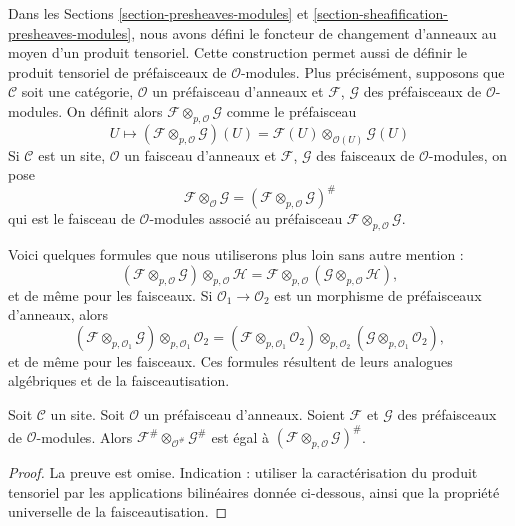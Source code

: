 \noindent
Dans les Sections \ref{section-presheaves-modules} et
\ref{section-sheafification-presheaves-modules}, nous avons défini le
foncteur de changement d'anneaux au moyen d'un produit tensoriel.
Cette construction permet aussi de définir le produit tensoriel de
préfaisceaux de $\mathcal{O}$-modules. Plus précisément, supposons que
$\mathcal{C}$ soit une catégorie, $\mathcal{O}$ un préfaisceau d'anneaux et
$\mathcal{F}$, $\mathcal{G}$ des préfaisceaux de $\mathcal{O}$-modules.
On définit alors $\mathcal{F} \otimes_{p, \mathcal{O}} \mathcal{G}$ comme le
préfaisceau
$$
U
\longmapsto
(\mathcal{F} \otimes_{p, \mathcal{O}} \mathcal{G})(U)
=
\mathcal{F}(U) \otimes_{\mathcal{O}(U)} \mathcal{G}(U)
$$
Si $\mathcal{C}$ est un site, $\mathcal{O}$ un faisceau d'anneaux et
$\mathcal{F}$, $\mathcal{G}$ des faisceaux de $\mathcal{O}$-modules, on pose
$$
\mathcal{F} \otimes_\mathcal{O} \mathcal{G}
=
(\mathcal{F} \otimes_{p, \mathcal{O}} \mathcal{G})^\#
$$
qui est le faisceau de $\mathcal{O}$-modules associé au préfaisceau
$\mathcal{F} \otimes_{p, \mathcal{O}} \mathcal{G}$.

\medskip\noindent
Voici quelques formules que nous utiliserons plus loin sans autre mention :
$$
(\mathcal{F}
\otimes_{p, \mathcal{O}} \mathcal{G})
\otimes_{p, \mathcal{O}} \mathcal{H}
=
\mathcal{F}
\otimes_{p, \mathcal{O}} (\mathcal{G}
\otimes_{p, \mathcal{O}} \mathcal{H}),
$$
et de même pour les faisceaux.
Si $\mathcal{O}_1 \to \mathcal{O}_2$ est un morphisme de préfaisceaux
d'anneaux, alors
$$
(\mathcal{F} \otimes_{p, \mathcal{O}_1} \mathcal{G})
\otimes_{p, \mathcal{O}_1} \mathcal{O}_2 =
(\mathcal{F} \otimes_{p, \mathcal{O}_1} \mathcal{O}_2)
\otimes_{p, \mathcal{O}_2}
(\mathcal{G} \otimes_{p, \mathcal{O}_1} \mathcal{O}_2),
$$
et de même pour les faisceaux.
Ces formules résultent de leurs analogues algébriques et de la
faisceautisation.

\begin{lemma}
\label{lemma-sheafification-tensor}
Soit $\mathcal{C}$ un site. Soit $\mathcal{O}$ un préfaisceau d'anneaux.
Soient $\mathcal{F}$ et $\mathcal{G}$ des préfaisceaux de
$\mathcal{O}$-modules. Alors
$\mathcal{F}^\# \otimes_{\mathcal{O}^\#} \mathcal{G}^\#$
est égal à
$(\mathcal{F} \otimes_{p, \mathcal{O}} \mathcal{G})^\#$.
\end{lemma}

\begin{proof}
La preuve est omise. Indication : utiliser la caractérisation du produit
tensoriel par les applications bilinéaires donnée ci-dessous, ainsi que la
propriété universelle de la faisceautisation.
\end{proof}

